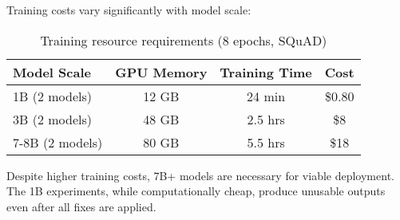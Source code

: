 \documentclass{article}
\begin{document}
Training costs vary significantly with model scale:

\begin{table}[h]
\caption{Training resource requirements (8 epochs, SQuAD)}
\vskip 0.15in
\begin{center}
\begin{small}
\begin{tabular}{lccc}
\toprule
Model Scale & GPU Memory & Training Time & Cost \\
\midrule
1B (2 models) & 12 GB & 24 min & \$0.80 \\
3B (2 models) & 48 GB & 2.5 hrs & \$8 \\
7-8B (2 models) & 80 GB & 5.5 hrs & \$18 \\
\bottomrule
\end{tabular}
\end{small}
\end{center}
\end{table}

Despite higher training costs, 7B+ models are necessary for viable deployment. The 1B experiments, while computationally cheap, produce unusable outputs even after all fixes are applied.
\end{document}
